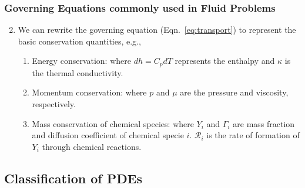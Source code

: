 \documentclass[10pt,compress]{beamer}
\begin{document}
\begin{frame}
 \frametitle{Governing Equations commonly used in Fluid Problems} 
\begin{enumerate}
  \setcounter{enumi}{1}
  \item <1-> We can rewrite the governing equation (Eqn.~\ref{eq:transport}) to represent the basic conservation quantities, e.g.,
     \begin{enumerate}
        \item <2-> Energy conservation:
            where $dh=C_{p}dT$ represents the enthalpy and $\kappa$ is the thermal conductivity.
         \item <3-> Momentum conservation:
          where $p$ and $\mu$ are the pressure and viscosity, respectively.
         \item <4-> Mass conservation of chemical species:
          where $Y_{i}$ and $\Gamma_{i}$ are mass fraction and diffusion coefficient of chemical specie $i$. $\mathcal{R}_{i}$ is the rate of formation of $Y_{i}$ through chemical reactions. 
      \end{enumerate}
\end{enumerate}   
 
\end{frame}


\subsection{Classification of PDEs}
\end{document}
